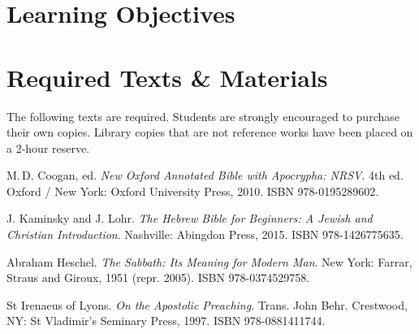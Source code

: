 \documentclass[titlepage]{article}
\newcommand\incl{../includes}
\begin{document}


  \section{Learning Objectives}
  \label{objectives}

  \edobject

\section{Required Texts \& Materials}
\label{texts}

The following texts are required. Students are strongly encouraged to
purchase their own copies. Library copies that are not reference works
have been placed on a 2-hour reserve.

\begingroup
\renewcommand{\section}[2]{}%
\begin{thebibliography}{Irenaeus}%

	 M.\,D. Coogan, ed.
    \emph{New Oxford Annotated Bible with Apocrypha: NRSV}. 4th ed.
    Oxford / New York: Oxford University Press, 2010.
    ISBN 978-0195289602.


	 J. Kaminsky and J. Lohr.
	\emph{The Hebrew Bible for Beginners: A Jewish and Christian Introduction}.
	Nashville: Abingdon Press, 2015.
	ISBN 978-1426775635.

	 Abraham Heschel.
	\emph{The Sabbath: Its Meaning for Modern Man}.
	New York: Farrar, Straus and Giroux, 1951 (repr. 2005).
	ISBN 978-0374529758.

	 St Irenaeus of Lyons.
	\emph{On the Apostolic Preaching}.
	Trans. John Behr.
	Crestwood, NY: St Vladimir’s Seminary Press, 1997.
	ISBN 978-0881411744.


\end{thebibliography}
\endgroup
\end{document}
